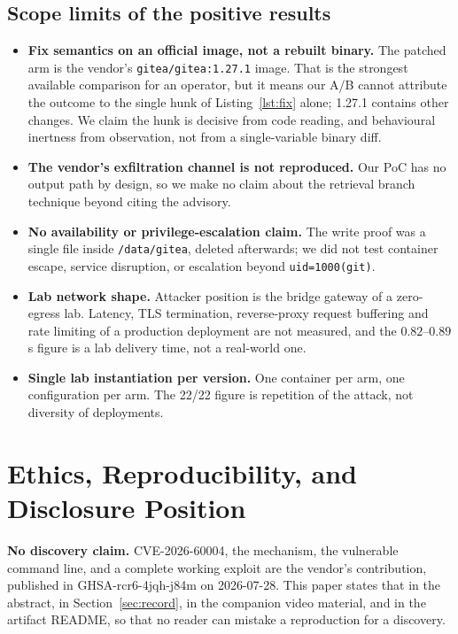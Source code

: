 \documentclass[journal]{IEEEtran}
\begin{document}
\subsection{Scope limits of the positive results}
\begin{itemize}
\item \textbf{Fix semantics on an official image, not a rebuilt binary.} The
patched arm is the vendor's \texttt{gitea/gitea:1.27.1} image. That is the
strongest available comparison for an operator, but it means our A/B cannot
attribute the outcome to the single hunk of Listing~\ref{lst:fix} alone; 1.27.1
contains other changes. We claim the hunk is decisive from code reading, and
behavioural inertness from observation, not from a single-variable binary
diff.
\item \textbf{The vendor's exfiltration channel is not reproduced.} Our PoC
has no output path by design, so we make no claim about the retrieval branch
technique beyond citing the advisory.
\item \textbf{No availability or privilege-escalation claim.} The write proof
was a single file inside \texttt{/data/gitea}, deleted afterwards; we did not
test container escape, service disruption, or escalation beyond
\texttt{uid=1000(git)}.
\item \textbf{Lab network shape.} Attacker position is the bridge gateway of a
zero-egress lab. Latency, TLS termination, reverse-proxy request buffering and
rate limiting of a production deployment are not measured, and the
$0.82$--$0.89$\,s figure is a lab delivery time, not a real-world one.
\item \textbf{Single lab instantiation per version.} One container per arm,
one configuration per arm. The 22/22 figure is repetition of the attack, not
diversity of deployments.
\end{itemize}

\section{Ethics, Reproducibility, and Disclosure Position}
\label{sec:ethics}

\textbf{No discovery claim.} CVE-2026-60004, the mechanism, the vulnerable
command line, and a complete working exploit are the vendor's contribution,
published in GHSA-rcr6-4jqh-j84m on 2026-07-28. This paper states that in the
abstract, in Section~\ref{sec:record}, in the companion video material, and in
the artifact README, so that no reader can mistake a reproduction for a
discovery.
\end{document}
